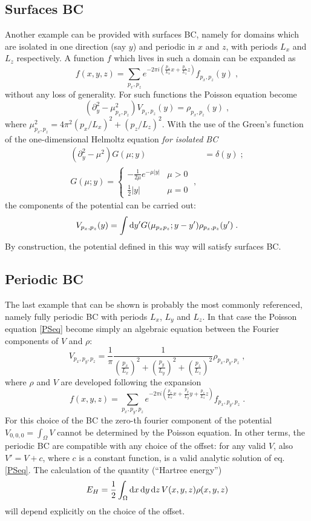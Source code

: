 \documentclass[a4paper]{article}
\newcommand{\dd}{{\rm d}}
\newcommand{\be}{\begin{equation}}
\newcommand{\ee}{\end{equation}}
\begin{document}
\subsection*{Surfaces BC}
Another example can be provided with surfaces BC, namely for domains which are isolated in one direction (say $y$) and periodic in $x$ and $z$, with periods $L_x$ and $L_z$ respectively. A function $f$ which lives in such a domain can be expanded as
\be \label{expansionSBC}
f(x,y,z)=\sum_{p_x,p_z} e^{-2\pi i\left(\frac{p_x}{L_x} x + \frac{p_z}{L_z} z\right)}
f_{p_x,p_z}(y)\;,
\ee
without any loss of generality.
For such functions the Poisson equation become
\be
\left(\partial_y^2 - \mu_{p_x,p_z}^2 \right) V_{p_x,p_z}(y) = \rho_{p_x,p_z}(y)\;,
\ee
where $\mu_{p_x,p_z}^2=4 \pi^2 (p_x/L_x)^2 +(p_z/L_z)^2$.
With the use of the Green's function of the one-dimensional Helmoltz equation \emph{for isolated BC}
\begin{align}
\left(\partial_y^2 - \mu^2 \right) G(\mu; y) &= \delta(y) \label{surfacesGF}\;; \\
G(\mu;y)=
\begin{cases}
 -\frac{1}{2 \mu} e^{-\mu |y|} & \mu > 0 \\
\frac{1}{2}|y| & \mu=0
\end{cases}\;,
\end{align}
the components of the potential can be carried out:
\begin{equation}
 V_{p_x,p_z}(y) = \int \dd y' G(\mu_{p_x p_z}; y-y') \rho_{p_x,p_z}(y')\;.
\end{equation}
By construction, the potential defined in this way will satisfy surfaces BC.

\subsection*{Periodic BC}
The last example that can be shown is probably the most commonly referenced, namely fully periodic BC with periods $L_x$, $L_y$ and $L_z$.
In that case the Poisson equation \eqref{PSeq} become simply an algebraic equation between the Fourier components of $V$ and $\rho$:
\be
V_{p_x,p_y,p_z} = \frac{1}{\pi}\frac{1}{\left(\frac{p_x}{L_x}\right)^2 + \left(\frac{p_y}{L_y}\right)^2 +\left(\frac{p_z}{L_z}\right)^2} \rho_{p_x,p_y,p_z}\;,
\ee
where $\rho$ and $V$ are developed following the expansion
\be
f(x,y,z)=\sum_{p_x,p_y,p_z} e^{-2\pi i\left(\frac{p_x}{L_x} x +\frac{p_y}{L_y} y+ \frac{p_z}{L_z} z\right)}
f_{p_x,p_y,p_z}\;.
\ee
For this choice of the BC the zero-th fourier component of the potential $V_{0,0,0}=\int_{\Omega} V$
cannot be determined by the Poisson equation. In other terms, the periodic BC are compatible with any choice of the offset: for any valid $V$, also $V'=V+c$, where $c$ is a constant function, is a valid analytic solution of eq. \eqref{PSeq}.
The calculation of the quantity (``Hartree energy'')
\be \label{ehart}
E_H=\frac{1}{2}\int_\Omega \dd x\, \dd y\, \dd z\, V(x,y,z) \rho(x,y,z)
\ee
will depend explicitly on the choice of the offset.
\end{document}
